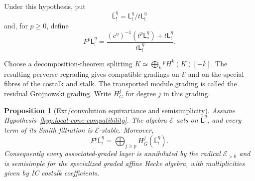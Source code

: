 \documentclass[11pt]{amsart}
\newtheorem{proposition}[theorem]{Proposition}
\theoremstyle{definition}
\theoremstyle{remark}
\begin{document}
Under this hypothesis, put
\[
 \overline{\mathsf L}_!^\eta=
 \mathsf L_!^\eta/t\mathsf L_!^\eta
\]
and, for $p\geq0$, define
\[
 F^p\overline{\mathsf L}_!^\eta=
 \frac{(c^\eta)^{-1}(t^p\mathsf L_*^\eta)+
       t\mathsf L_!^\eta}{t\mathsf L_!^\eta}.
\]

Choose a decomposition-theorem splitting
$K\simeq\bigoplus_k{}^pH^k(K)[-k]$.  The resulting perverse regrading gives
compatible gradings on $\mathcal E$ and on the special fibres of the
costalk and stalk.  The transported module grading is called the residual
Grojnowski grading.  Write $H_G^j$ for degree $j$ in this grading.

\begin{proposition}[Ext/convolution equivariance and semisimplicity]
\label{prop:ext-equivariance}
Assume Hypothesis~\ref{hyp:local-cone-compatibility}.
The algebra $\mathcal E$ acts on
$\overline{\mathsf L}_!^\eta$, and every term of its Smith filtration is
$\mathcal E$-stable.  Moreover,
\[
 F^p\overline{\mathsf L}_!^\eta=
 \bigoplus_{j\geq p}H_G^j(\overline{\mathsf L}_!^\eta).
\]
Consequently every associated-graded layer is annihilated by the radical
$\mathcal E_{>0}$ and is semisimple for the specialized graded affine Hecke
algebra, with multiplicities given by IC costalk coefficients.
\end{proposition}
\end{document}
